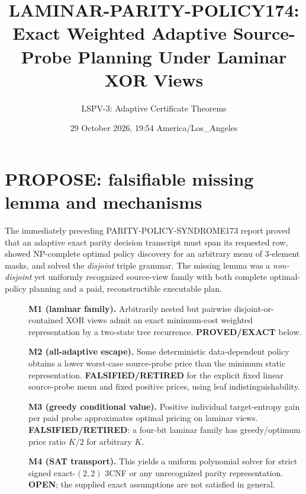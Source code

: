\documentclass[11pt]{article}
\title{LAMINAR-PARITY-POLICY174: Exact Weighted Adaptive Source-Probe Planning Under Laminar XOR Views}
\author{LSPV-3: Adaptive Certificate Theorems}
\date{29 October 2026, 19:54 America/Los\_Angeles}
\begin{document}
\maketitle
\begin{center}\end{center}

\section{PROPOSE: falsifiable missing lemma and mechanisms}
The immediately preceding PARITY-POLICY-SYNDROME173 report proved that an adaptive exact parity decision transcript must span its requested row, showed NP-complete optimal policy discovery for an arbitrary menu of 3-element masks, and solved the \emph{disjoint} triple grammar. The missing lemma was a \emph{non-disjoint} yet uniformly recognized source-view family with both complete optimal-policy planning and a paid, reconstructible executable plan.
\begin{description}
\item[] \textbf{M1 (laminar family).} Arbitrarily nested but pairwise disjoint-or-contained XOR views admit an exact minimum-cost weighted representation by a two-state tree recurrence. \textbf{PROVED/EXACT} below.
\item[] \textbf{M2 (all-adaptive escape).} Some deterministic data-dependent policy obtains a lower worst-case source-probe price than the minimum static representation. \textbf{FALSIFIED/RETIRED} for the explicit fixed linear source-probe menu and fixed positive prices, using leaf indistinguishability.
\item[] \textbf{M3 (greedy conditional value).} Positive individual target-entropy gain per paid probe approximates optimal pricing on laminar views. \textbf{FALSIFIED/RETIRED}: a four-bit laminar family has greedy/optimum price ratio $K/2$ for arbitrary $K$.
\item[] \textbf{M4 (SAT transport).} This yields a uniform polynomial solver for strict signed exact-$(2,2)$ 3CNF or any unrecognized parity representation. \textbf{OPEN}; the supplied exact assumptions are not satisfied in general.
\end{description}
\end{document}
